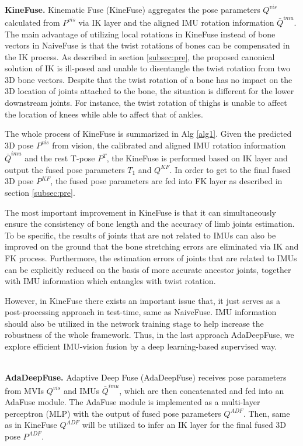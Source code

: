 \documentclass[lettersize,journal]{IEEEtran}
\begin{document}
~\\
\noindent \textbf{KineFuse.}
\quad Kinematic Fuse (KineFuse) aggregates the pose parameters $Q^{vis}$ calculated from $P^{vis}$ via IK layer and the aligned IMU rotation information $\bar{Q}^{imu}$. The main advantage of utilizing local rotations in KineFuse instead of bone vectors in NaiveFuse is that the twist rotations of bones can be compensated in the IK process. As described in section \ref{subsec:pre}, the proposed canonical solution of IK is ill-posed and unable to disentangle the twist rotation from two 3D bone vectors. Despite that the twist rotation of a bone has no impact on the 3D location of joints attached to the bone, the situation is different for the lower downstream joints. For instance, the twist rotation of thighs is unable to affect the location of knees while able to affect that of ankles. 

The whole process of KineFuse is summarized in Alg \ref{alg1}. Given the predicted 3D pose $P^{vis}$ from vision, the calibrated and aligned IMU rotation information $\bar{Q}^{imu}$ and the rest T-pose $P^{T}$, the KineFuse is performed based on IK layer and output the fused pose parameters $T_{1}$ and $Q^{KF}$. In order to get to the final fused 3D pose $P^{KF}$, the fused pose parameters are fed into FK layer as described in section \ref{subsec:pre}.

The most important improvement in KineFuse is that it can simultaneously ensure the consistency of bone length and the accuracy of limb joints estimation. To be specific, the results of joints that are not related to IMUs can also be improved on the ground that the bone stretching errors are eliminated via IK and FK process. Furthermore, the estimation errors of joints that are related to IMUs can be explicitly reduced on the basis of more accurate ancestor joints, together with IMU information which entangles with twist rotation.

However, in KineFuse there exists an important issue that, it just serves as a post-processing approach in test-time, same as NaiveFuse. IMU information should also be utilized in the network training stage to help increase the robustness of the whole framework. Thus, in the last approach AdaDeepFuse, we explore efficient IMU-vision fusion by a deep learning-based supervised way.

~\\
\noindent \textbf{AdaDeepFuse.} Adaptive Deep Fuse (AdaDeepFuse) receives pose parameters from MVIs $Q^{vis}$ and IMUs $\bar{Q}^{imu}$, which are then concatenated and fed into an AdaFuse module. The AdaFuse module is implemented as a multi-layer perceptron (MLP) with the output of fused pose parameters $Q^{ADF}$. Then, same as in KineFuse $Q^{ADF}$ will be utilized to infer an IK layer for the final fused 3D pose $P^{ADF}$.
\end{document}
